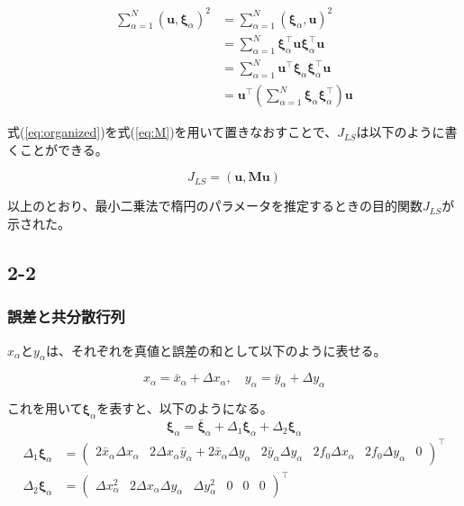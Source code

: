 \documentclass[12pt,a4j]{jsarticle}
\newcommand{\xa}{x_\alpha}
\newcommand{\bxa}{\bar{x}_\alpha}
\newcommand{\dxa}{\Delta x_\alpha}
\newcommand{\ya}{y_\alpha}
\newcommand{\bya}{\bar{y}_\alpha}
\newcommand{\dya}{\Delta y_\alpha}
\newcommand{\xia}{\bm{\xi}_\alpha}
\newcommand{\bxia}{\bar{\bm{\xi}}_\alpha}
\begin{document}
  \begin{align}
    \sum_{\alpha = 1}^N (\bm{u}, \xia)^2 &= \sum_{\alpha = 1}^N (\xia, \bm{u})^2 \nonumber \\
     &= \sum_{\alpha = 1}^N \xia^\top \bm{u} \xia^\top \bm{u} \nonumber \\
     &= \sum_{\alpha = 1}^N \bm{u}^\top \xia \xia^\top \bm{u} \nonumber \\
     &= \bm{u}^\top \left(\sum_{\alpha = 1}^N \xia \xia^\top \right) \bm{u} \label{eq:organized}
  \end{align}

  式(\ref{eq:organized})を式(\ref{eq:M})を用いて置きなおすことで、$J_{LS}$は以下のように書くことができる。

  \begin{equation}
    J_{LS} = (\bm{u}, \bm{Mu})
  \end{equation}

  以上のとおり、最小二乗法で楕円のパラメータを推定するときの目的関数$J_{LS}$が示された。

  \subsection*{2-2}
    \subsubsection*{誤差と共分散行列}
      $\xa$と$\ya$は、それぞれを真値と誤差の和として以下のように表せる。

      \begin{equation}
        \xa = \bxa + \dxa, \quad \ya = \bya + \dya
      \end{equation}

      これを用いて$\xia$を表すと、以下のようになる。
      \begin{equation}
        \xia = \bxia + \Delta_1\xia + \Delta_2\xia
      \end{equation}
      \begin{align}
        \Delta_1\xia &= \begin{pmatrix}2\bxa\dxa & 2\dxa\bya + 2\bxa\dya & 2\bya\dya & 2f_0\dxa & 2f_0\dya & 0\end{pmatrix}^\top \\
        \Delta_2\xia &= \begin{pmatrix}\dxa^2 & 2\dxa\dya & \dya^2 & 0 & 0 & 0 \end{pmatrix}^\top
      \end{align}
\end{document}
